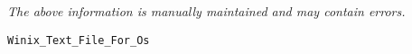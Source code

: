 \label{pkg:winix\_text\_file\_for\_posix}

{\tiny \it The above information is manually maintained and may contain errors.}
\begin{verbatim}
Winix_Text_File_For_Os
\end{verbatim}
